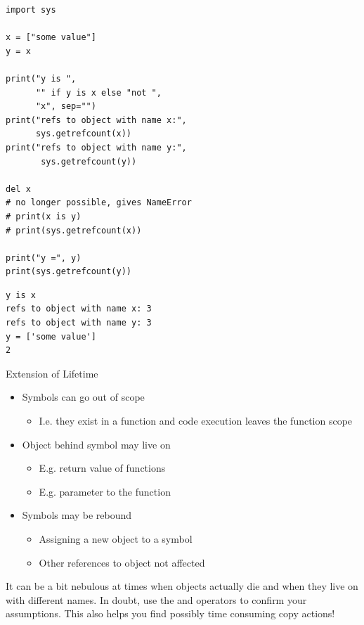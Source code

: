 \begin{frame}[fragile]
%
\begin{tcbraster}[raster columns=2,
                  raster equal height,
                  nobeforeafter,
                  raster column skip=0.2cm]
\begin{codebox}
\begin{verbatim}
import sys

x = ["some value"]
y = x

print("y is ", 
      "" if y is x else "not ", 
      "x", sep="")
print("refs to object with name x:", 
      sys.getrefcount(x))
print("refs to object with name y:", 
       sys.getrefcount(y))

del x
# no longer possible, gives NameError
# print(x is y)
# print(sys.getrefcount(x))

print("y =", y)
print(sys.getrefcount(y))
\end{verbatim}
\end{codebox}
%
\begin{cmdbox}[Output]
\begin{verbatim}
y is x
refs to object with name x: 3
refs to object with name y: 3
y = ['some value']
2
\end{verbatim}
\end{cmdbox}
\end{tcbraster}
%
\end{frame}


\begin{frame}{Extension of Lifetime}
%
\begin{itemize}
\item Symbols can go out of scope
	\begin{itemize}
	\item I.\;e. they exist in a function and code execution leaves the function scope
	\end{itemize}
\item Object behind symbol may live on
	\begin{itemize}
	\item E.\;g. return value of functions
	\item E.\;g. parameter to the function
	\end{itemize}
\item Symbols may be rebound
	\begin{itemize}
	\item Assigning a new object to a symbol
	\item Other references to object not affected
	\end{itemize}
\end{itemize}
%
\begin{hintbox}
\small
It can be a bit nebulous at times when objects actually die and when they live on with different names. In doubt, use the  and  operators to confirm your assumptions. This also helps you find possibly time consuming copy actions!
\end{hintbox}
%
\end{frame}

